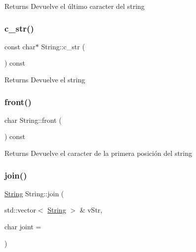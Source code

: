 \begin{DoxyReturn}{Returns}
Devuelve el último caracter del string 
\end{DoxyReturn}
\mbox{\label{class_string_a0274f3e61533d15086816fb7f47ccb54}} 
\subsubsection{\texorpdfstring{c\+\_\+str()}{c\_str()}}
{\footnotesize\ttfamily const char$\ast$ String\+::c\+\_\+str (\begin{DoxyParamCaption}{ }\end{DoxyParamCaption}) const}

\begin{DoxyReturn}{Returns}
Devuelve el string 
\end{DoxyReturn}
\mbox{\label{class_string_aaac2d7b67a3d6ba926365c88a16d71e6}} 
\subsubsection{\texorpdfstring{front()}{front()}}
{\footnotesize\ttfamily char String\+::front (\begin{DoxyParamCaption}{ }\end{DoxyParamCaption}) const}

\begin{DoxyReturn}{Returns}
Devuelve el caracter de la primera posición del string 
\end{DoxyReturn}
\mbox{\label{class_string_ad819c6db041854f0b6908b530ffd4331}} 
\subsubsection{\texorpdfstring{join()}{join()}}
{\footnotesize\ttfamily \hyperlink{class_string}{String} String\+::join (\begin{DoxyParamCaption}\item[{std\+::vector$<$ \hyperlink{class_string}{String} $>$ \&}]{v\+Str,  }\item[{char}]{joint = {\ttfamily \textquotesingle{}~\textquotesingle{}} }\end{DoxyParamCaption})}



